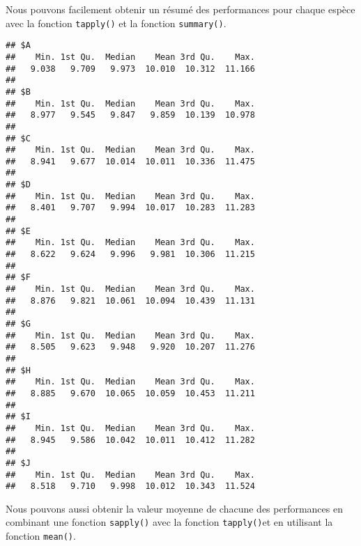 \documentclass[]{book}
\newenvironment{Shaded}{\begin{snugshade}}{\end{snugshade}}
\newcommand{\KeywordTok}[1]{\textcolor[rgb]{0.13,0.29,0.53}{\textbf{#1}}}
\newcommand{\DataTypeTok}[1]{\textcolor[rgb]{0.13,0.29,0.53}{#1}}
\newcommand{\DecValTok}[1]{\textcolor[rgb]{0.00,0.00,0.81}{#1}}
\newcommand{\ControlFlowTok}[1]{\textcolor[rgb]{0.13,0.29,0.53}{\textbf{#1}}}
\newcommand{\OperatorTok}[1]{\textcolor[rgb]{0.81,0.36,0.00}{\textbf{#1}}}
\newcommand{\NormalTok}[1]{#1}
\theoremstyle{definition}
\theoremstyle{definition}
\theoremstyle{definition}
\theoremstyle{remark}
\begin{document}
Nous pouvons facilement obtenir un résumé des performances pour chaque
espèce avec la fonction \texttt{tapply()} et la fonction
\texttt{summary()}.

\begin{Shaded}
\end{Shaded}

\begin{verbatim}
## $A
##    Min. 1st Qu.  Median    Mean 3rd Qu.    Max. 
##   9.038   9.709   9.973  10.010  10.312  11.166 
## 
## $B
##    Min. 1st Qu.  Median    Mean 3rd Qu.    Max. 
##   8.977   9.545   9.847   9.859  10.139  10.978 
## 
## $C
##    Min. 1st Qu.  Median    Mean 3rd Qu.    Max. 
##   8.941   9.677  10.014  10.011  10.336  11.475 
## 
## $D
##    Min. 1st Qu.  Median    Mean 3rd Qu.    Max. 
##   8.401   9.707   9.994  10.017  10.283  11.283 
## 
## $E
##    Min. 1st Qu.  Median    Mean 3rd Qu.    Max. 
##   8.622   9.624   9.996   9.981  10.306  11.215 
## 
## $F
##    Min. 1st Qu.  Median    Mean 3rd Qu.    Max. 
##   8.876   9.821  10.061  10.094  10.439  11.131 
## 
## $G
##    Min. 1st Qu.  Median    Mean 3rd Qu.    Max. 
##   8.505   9.623   9.948   9.920  10.207  11.276 
## 
## $H
##    Min. 1st Qu.  Median    Mean 3rd Qu.    Max. 
##   8.885   9.670  10.065  10.059  10.453  11.211 
## 
## $I
##    Min. 1st Qu.  Median    Mean 3rd Qu.    Max. 
##   8.945   9.586  10.042  10.011  10.412  11.282 
## 
## $J
##    Min. 1st Qu.  Median    Mean 3rd Qu.    Max. 
##   8.518   9.710   9.998  10.012  10.343  11.524
\end{verbatim}

Nous pouvons aussi obtenir la valeur moyenne de chacune des performances
en combinant une fonction \texttt{sapply()} avec la fonction
\texttt{tapply()}et en utilisant la fonction \texttt{mean()}.

\begin{Shaded}
\end{Shaded}
\end{document}
